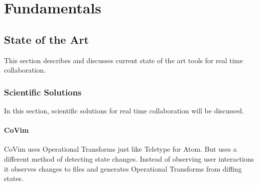 \chapter{Fundamentals}
\label{sec:fundamentals}

\section{State of the Art}
\label{sec:stateoftheart}

This section describes and discusses current state of the art tools for real time collaboration.

\subsection{Scientific Solutions}

In this section, scientific solutions for real time collaboration will be discussed.

\subsubsection{CoVim}
CoVim\cite{ChoNgSun:2017:CoVim:Incorporatingreal-timecollaborationcapabilitiesintocomprehensivetexteditors} uses Operational Transforms just like Teletype for Atom. But uses a different method of detecting state changes. Instead of observing user interactions it observes changes to files and generates Operational Transforms from diffing states.


